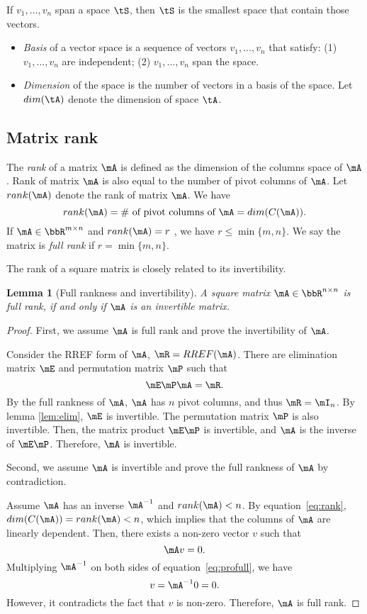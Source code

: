 \documentclass[11pt]{article}
\theoremstyle{plain}
\newtheorem{lem}{Lemma}
\theoremstyle{definition}
\begin{document}
If  $v_1 ,...,v_n$ span a space $\tS$, then $\tS$ is the smallest space that contain those vectors.

\begin{itemize}
	\item \textit{Basis} of a vector space is a sequence of vectors $v_1 ,...,v_n$ that satisfy: (1) $v_1 ,...,v_n$ are independent; (2) $v_1 ,...,v_n$ span the space.
	\item \textit{Dimension} of the space is the number of vectors in a basis of the space. Let $dim(\tA)$ denote the dimension of space $\tA$.
\end{itemize}

\subsection{Matrix rank}
The \textit{rank} of a matrix $\mA$ is defined as the dimension of the columns space of $\mA$. Rank of matrix $\mA$ is also equal to the number of pivot columns of $\mA$. Let $rank(\mA)$ denote the rank of matrix $\mA$. We have
\begin{equation}\label{eq:rank}
	rank(\mA) = \# \text{ of pivot columns of }\mA = dim(C(\mA)).
\end{equation}
If $\mA\in \bbR^{m \times n}$ and $rank(\mA) = r$ , we have $r \leq \min\{m,n\} $. We say the matrix is \textit{full rank} if $r = \min\{m,n\}$.

\vspace{.2cm}
The rank of a square matrix is closely related to its invertibility. 
\begin{lem}[Full rankness and invertibility]\label{lem:fullrank} A square matrix $\mA \in \bbR^{n \times n}$ is full rank, if and only if $\mA$ is an invertible matrix.
\end{lem}

\begin{proof}
	First, we assume $\mA$ is full rank and prove the invertibility of $\mA$.
	
	Consider the RREF form of $\mA$, $\mR = RREF(\mA)$. There are elimination matrix $\mE$ and permutation matrix $\mP$ such that
	\[ \mE \mP \mA =  \mR. \]
	By the full rankness of $\mA$,  $\mA$ has $n$ pivot columns, and thus $\mR = \mI_n$. By lemma \ref{lem:elim}, $\mE$ is invertible. The permutation matrix $\mP$ is also invertible. Then, the matrix product $\mE \mP$ is invertible, and $\mA$ is the inverse of $\mE \mP$. Therefore, $\mA$ is invertible.
	
	Second, we assume $\mA$ is invertible and prove the full rankness of $\mA$ by contradiction. 
	
  Assume $\mA$ has an inverse $\mA^{-1}$ and $rank(\mA) < n$. By equation~\eqref{eq:rank}, $dim(C(\mA)) = rank(\mA)<n$, which implies that the columns of $\mA$ are linearly dependent. Then, there exists a non-zero vector $v$ such that 
  \begin{equation}\label{eq:profull}
  	\mA v = 0.
  \end{equation}
Multiplying $\mA^{-1}$ on both sides of equation~\eqref{eq:profull}, we have \[ v = \mA^{-1} 0 = 0.\] However, it contradicts the fact that $v$ is non-zero. Therefore, $\mA$ is full rank.
\end{proof}
\end{document}
